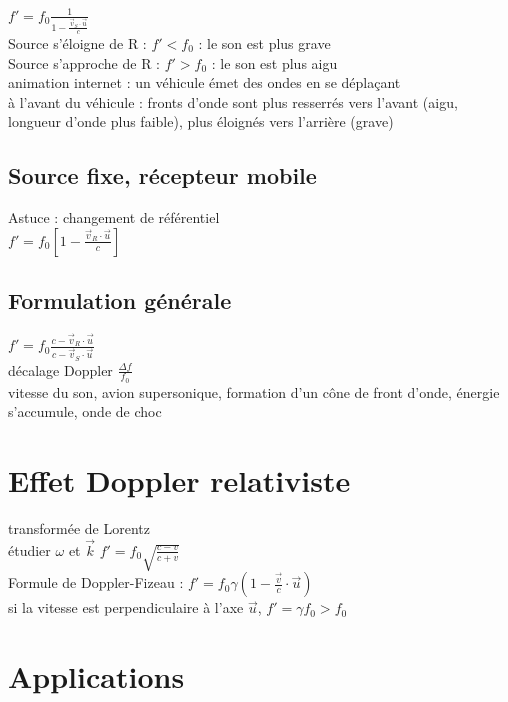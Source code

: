 $f'=f_0 \frac{1}{1-\frac{\vec{v}_S \cdot \vec{u}}{c}}$ \\

Source s'éloigne de R : $f'<f_0$ : le son est plus grave \\
Source s'approche de R : $f'>f_0$ : le son est plus aigu \\

animation internet : un véhicule émet des ondes en se déplaçant \\
à l'avant du véhicule : fronts d'onde sont plus resserrés vers l'avant (aigu, longueur d'onde plus faible), plus éloignés vers l'arrière (grave)

\subsection{Source fixe, récepteur mobile}

Astuce : changement de référentiel \\
$f'=f_0 \left[ 1-\frac{\vec{v}_R \cdot \vec{u}}{c} \right]$ \\

\subsection{Formulation générale}
$f'=f_0 \frac{c-\vec{v}_R \cdot \vec{u}}{c-\vec{v}_S \cdot \vec{u}}$ \\
décalage Doppler $\frac{\Delta f}{f_0}$\\

vitesse du son, avion supersonique, formation d'un cône de front d'onde, énergie s'accumule, onde de choc \\

\section{Effet Doppler relativiste} 

transformée de Lorentz \\
étudier $\omega$ et $\vec{k}$
$f'=f_0 \sqrt{\frac{c-v}{c+v}}$ \\ 
Formule de Doppler-Fizeau : $f'=f_0 \gamma \left( 1-\frac{\vec{v}}{c} \cdot \vec{u} \right)$ \\
si la vitesse est perpendiculaire à l'axe $\vec{u}$, $f'=\gamma f_0 > f_0$ 



\section{Applications}
